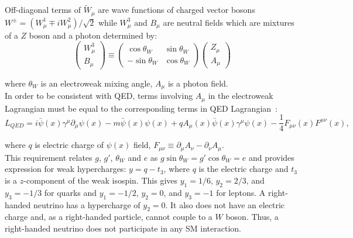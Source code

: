 Off-diagonal terms of ${\tilde{W}}_\mu$ are wave functions of charged vector bosons $W^{\pm}=(W_\mu^1 \mp i W_\mu^2)/{\sqrt{2}}$ while $W_\mu^3$ and $B_\mu$ are neutral fields which are mixtures of a $Z$ boson and a photon determined by: \\

\begin{equation}
  \begin{pmatrix} W_\mu^3 \\ B_\mu \end{pmatrix} \equiv
  \begin{pmatrix} \cos \theta_W & \sin \theta_W \\ -\sin \theta_W & \cos \theta_W \end{pmatrix}
  \begin{pmatrix} Z_\mu \\ A_\mu \end{pmatrix}
\end{equation} 

where $\theta_W$ is an electroweak mixing angle, $A_\mu$ is a photon field.\\

In order to be consistent with QED, terms involving $A_\mu$ in the electroweak Lagrangian must be equal to the corresponding terms in QED Lagrangian~\cite{ref_Pich}:\\

\begin{equation}\label{eq:L_QED}
L_{QED} = i \bar{\psi}(x) \gamma^\mu \partial_\mu \psi(x) - m \bar{\psi}(x) \psi(x) + q A_\mu(x) \bar{\psi}(x) \gamma^\mu \psi(x) - \frac{1}{4} F_{\mu\nu}(x) F^{\mu\nu}(x),
\end{equation}

where $q$ is electric charge of $\psi(x)$ field, $F_{\mu\nu} \equiv \partial_\mu A_\nu - \partial_\nu A_\mu$.\\

This requirement relates $g$, $g'$, $\theta_W$ and $e$ as $g \sin \theta_W = g' \cos \theta_W = e$ and provides expression for weak hypercharges: $y = q - t_3$, where $q$ is the electric charge and $t_3$ is a $z$-component of the weak isospin. This gives $y_1=1/6$, $y_2=2/3$, and $y_3=-1/3$ for quarks and $y_1=-1/2$, $y_2=0$, and $y_3=-1$ for leptons. A right-handed neutrino has a hypercharge of $y_2=0$. It also does not have an electric charge and, as a right-handed particle, cannot couple to a $W$ boson. Thus, a right-handed neutrino does not participate in any SM interaction.\\

